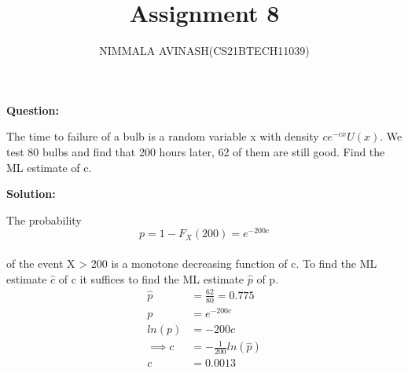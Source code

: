 \documentclass[journal,twocolumn]{IEEEtran}
\title{Assignment 8}
\author{NIMMALA AVINASH(CS21BTECH11039)}
\begin{document}
\maketitle

{\LARGE \textbf{Question:\\}}

\begin{large}

The time to failure of a bulb is a random variable x with density $ ce^{-cx}U(x)$. We test 80 bulbs 
and find that 200 hours later, 62 of them are still good. Find the ML estimate of c. \\

\end{large}
{\LARGE \textbf{Solution:\\}}
\begin{large}
The probability\\
$$ p=1-F_{X}(200)=e^{-200c} $$\\
of the event {X > 200} is a monotone decreasing function of c. To find the ML estimate $\hat{c}$ of c it suffices to find
the ML estimate $ \hat{p} $ of p.\\
\begin{align}
\hat{p}&= \frac{62}{80} = 0.775 \\
p&=e^{-200c}\\
ln(p)&=-200c\\
\implies c&=-\frac{1}{200}ln(\hat{p}) \\
c&=0.0013
\end{align}
\end{large}
\end{document}
